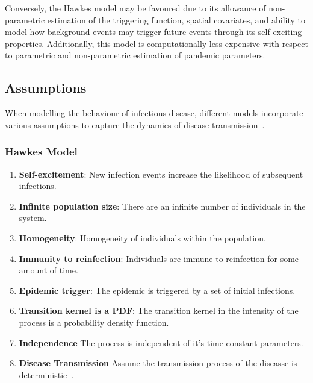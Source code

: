 \documentclass[12pt]{article}
\begin{document}
Conversely, the Hawkes model may be favoured due to its allowance of non-parametric estimation of the triggering function, spatial covariates, and ability to model how background events may trigger future events through its self-exciting properties. Additionally, this model is computationally less expensive with respect to parametric and non-parametric estimation of pandemic parameters. 



\subsection{Assumptions}
When modelling the behaviour of infectious disease, different models incorporate various assumptions to capture the dynamics of disease transmission~\cite{Kresin2022, Lamprinakou2023}. 


\subsubsection{Hawkes Model}
\begin{enumerate}
\item {\bf Self-excitement}: New infection events increase the likelihood of subsequent infections. 
\item {\bf Infinite population size}: There are an infinite number of individuals in the system.
\item {\bf Homogeneity}: Homogeneity of individuals within the population.
\item {\bf Immunity to reinfection}: Individuals are immune to reinfection for some amount of time. 
\item {\bf Epidemic trigger}: The epidemic is triggered by a set of initial infections.
\item {\bf Transition kernel is a PDF}: The transition kernel in the intensity of the process is a probability density function. 
\item {\bf Independence} The process is independent of it's time-constant parameters. 
\item {\bf Disease Transmission} Assume the transmission process of the diseasse is deterministic~\cite{Brauer2019}. 
\end{enumerate}
\end{document}
